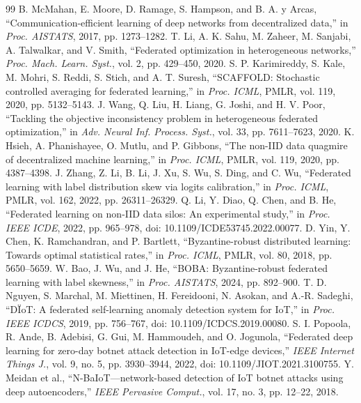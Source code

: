 \documentclass{ieeeaccess}
\begin{document}
\begin{thebibliography}{99}
 B. McMahan, E. Moore, D. Ramage, S. Hampson, and B. A. y Arcas, ``Communication-efficient learning of deep networks from decentralized data,'' in \emph{Proc. AISTATS}, 2017, pp. 1273--1282.
 T. Li, A. K. Sahu, M. Zaheer, M. Sanjabi, A. Talwalkar, and V. Smith, ``Federated optimization in heterogeneous networks,'' \emph{Proc. Mach. Learn. Syst.}, vol. 2, pp. 429--450, 2020.
 S. P. Karimireddy, S. Kale, M. Mohri, S. Reddi, S. Stich, and A. T. Suresh, ``SCAFFOLD: Stochastic controlled averaging for federated learning,'' in \emph{Proc. ICML}, PMLR, vol. 119, 2020, pp. 5132--5143.
 J. Wang, Q. Liu, H. Liang, G. Joshi, and H. V. Poor, ``Tackling the objective inconsistency problem in heterogeneous federated optimization,'' in \emph{Adv. Neural Inf. Process. Syst.}, vol. 33, pp. 7611--7623, 2020.
 K. Hsieh, A. Phanishayee, O. Mutlu, and P. Gibbons, ``The non-IID data quagmire of decentralized machine learning,'' in \emph{Proc. ICML}, PMLR, vol. 119, 2020, pp. 4387--4398.
 J. Zhang, Z. Li, B. Li, J. Xu, S. Wu, S. Ding, and C. Wu, ``Federated learning with label distribution skew via logits calibration,'' in \emph{Proc. ICML}, PMLR, vol. 162, 2022, pp. 26311--26329.
 Q. Li, Y. Diao, Q. Chen, and B. He, ``Federated learning on non-IID data silos: An experimental study,'' in \emph{Proc. IEEE ICDE}, 2022, pp. 965--978, doi: 10.1109/ICDE53745.2022.00077.
 D. Yin, Y. Chen, K. Ramchandran, and P. Bartlett, ``Byzantine-robust distributed learning: Towards optimal statistical rates,'' in \emph{Proc. ICML}, PMLR, vol. 80, 2018, pp. 5650--5659.
 W. Bao, J. Wu, and J. He, ``BOBA: Byzantine-robust federated learning with label skewness,'' in \emph{Proc. AISTATS}, 2024, pp. 892--900.
 T. D. Nguyen, S. Marchal, M. Miettinen, H. Fereidooni, N. Asokan, and A.-R. Sadeghi, ``D{\"I}oT: A federated self-learning anomaly detection system for IoT,'' in \emph{Proc. IEEE ICDCS}, 2019, pp. 756--767, doi: 10.1109/ICDCS.2019.00080.
 S. I. Popoola, R. Ande, B. Adebisi, G. Gui, M. Hammoudeh, and O. Jogunola, ``Federated deep learning for zero-day botnet attack detection in IoT-edge devices,'' \emph{IEEE Internet Things J.}, vol. 9, no. 5, pp. 3930--3944, 2022, doi: 10.1109/JIOT.2021.3100755.
 Y. Meidan et al., ``N-BaIoT---network-based detection of IoT botnet attacks using deep autoencoders,'' \emph{IEEE Pervasive Comput.}, vol. 17, no. 3, pp. 12--22, 2018.

\end{thebibliography}
\end{document}
